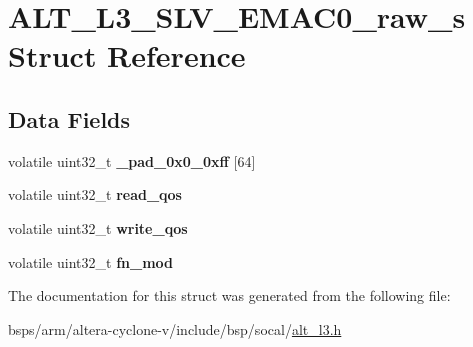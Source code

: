 \hypertarget{structALT__L3__SLV__EMAC0__raw__s}{}\section{A\+L\+T\+\_\+\+L3\+\_\+\+S\+L\+V\+\_\+\+E\+M\+A\+C0\+\_\+raw\+\_\+s Struct Reference}
\label{structALT__L3__SLV__EMAC0__raw__s}
\subsection*{Data Fields}
\begin{DoxyCompactItemize}
\item 
\mbox{\label{structALT__L3__SLV__EMAC0__raw__s_a3a65de2a3db0c9a0010d313cbfc5a078}} 
volatile uint32\+\_\+t {\bfseries \+\_\+pad\+\_\+0x0\+\_\+0xff} \mbox{[}64\mbox{]}
\item 
\mbox{\label{structALT__L3__SLV__EMAC0__raw__s_a3005d84c9528f85e78d17d4c6c723580}} 
volatile uint32\+\_\+t {\bfseries read\+\_\+qos}
\item 
\mbox{\label{structALT__L3__SLV__EMAC0__raw__s_abc20726a42cd0b7c9ffc66825838b3f7}} 
volatile uint32\+\_\+t {\bfseries write\+\_\+qos}
\item 
\mbox{\label{structALT__L3__SLV__EMAC0__raw__s_aae9ef07975000a82e547867b418d47d0}} 
volatile uint32\+\_\+t {\bfseries fn\+\_\+mod}
\end{DoxyCompactItemize}


The documentation for this struct was generated from the following file\+:\begin{DoxyCompactItemize}
\item 
bsps/arm/altera-\/cyclone-\/v/include/bsp/socal/\mbox{\hyperlink{alt__l3_8h}{alt\+\_\+l3.\+h}}\end{DoxyCompactItemize}
